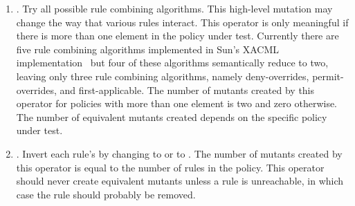 {\begin{enumerate}
\item {}. Try all
possible rule combining algorithms. This high-level mutation may
change the way that various rules interact. This operator is only
meaningful if there is more than one  element in the
policy under test. Currently there are five rule combining
algorithms implemented in Sun's XACML
implementation~\cite{sun05:xacml} but four of these algorithms
semantically reduce to two, leaving only three rule combining
algorithms, namely deny-overrides, permit-overrides, and
first-applicable. The number of mutants created by this operator for
policies with more than one  element is two and zero
otherwise. The number of equivalent mutants created depends on the
specific policy under test.

\item {}. Invert each rule's
 by changing  to  or
 to . The number of mutants created by
this operator is equal to the number of rules in the policy. This
operator should never create equivalent mutants unless a rule is
unreachable, in which case the rule should probably be removed.

\end{enumerate}
}
